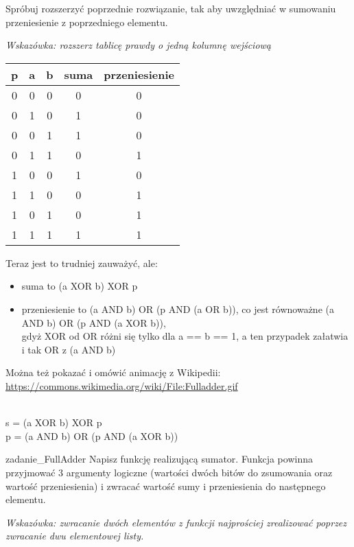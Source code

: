 \documentclass{pdfBooklets}
\begin{document}
\begin{Zadanie}{}{}
Spróbuj rozszerzyć poprzednie rozwiązanie, tak aby uwzględniać w sumowaniu przeniesienie z poprzedniego elementu.

\emph{Wskazówka: rozszerz tablicę prawdy o jedną kolumnę wejściową}

\begin{teacherOnly}

\begin{tabular}{c|c|c||c|c}
p & a & b  &  suma & przeniesienie\\
\hline
0 & 0 & 0  &  0 & 0\\
0 & 1 & 0  &  1 & 0\\
0 & 0 & 1  &  1 & 0\\
0 & 1 & 1  &  0 & 1\\
%
1 & 0 & 0  &  1 & 0\\
1 & 1 & 0  &  0 & 1\\
1 & 0 & 1  &  0 & 1\\
1 & 1 & 1  &  1 & 1\\
\end{tabular}

\vspace{6pt} Teraz jest to trudniej zauważyć, ale:
\begin{itemize}
\item suma to (a XOR b) XOR p
\item przeniesienie to (a AND b) OR (p AND (a OR b)), co jest równoważne (a AND b) OR (p AND (a XOR b)),\\
      gdyż XOR od OR różni się tylko dla a == b == 1, a ten przypadek załatwia i tak OR z (a AND b)
\end{itemize}

Można też pokazać i omówić animację z Wikipedii: \url{https://commons.wikimedia.org/wiki/File:Fulladder.gif}
\end{teacherOnly}
\end{Zadanie}

\begin{teacherOnly}
\vspace{8pt}\noindent{}\\
s = (a XOR b) XOR p\\
p = (a AND b) OR (p AND (a XOR b))\\
\end{teacherOnly}

\begin{Zadanie}{}{zadanie_FullAdder}
Napisz funkcję realizującą sumator. Funkcja powinna przyjmować 3 argumenty logiczne (wartości dwóch bitów do zsumowania oraz wartość przeniesienia) i zwracać wartość sumy i przeniesienia do następnego elementu.

\emph{Wskazówka: zwracanie dwóch elementów z funkcji najprościej zrealizować poprzez zwracanie dwu elementowej listy.}
\end{Zadanie}
\end{document}
